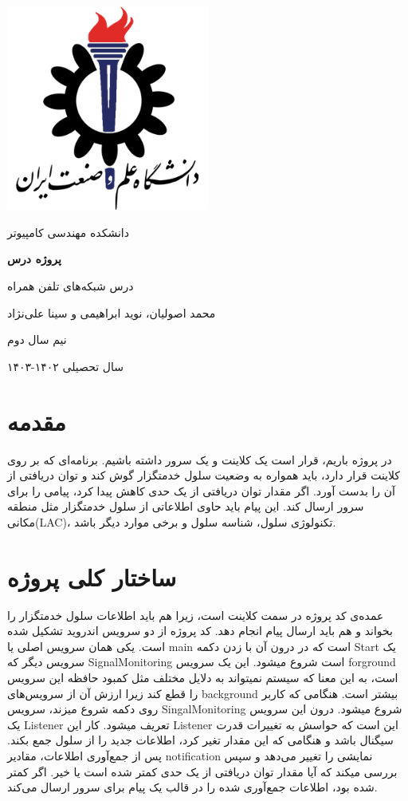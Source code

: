 \documentclass{article}
\begin{document}
\begin{titlepage}
  \centering
  \includegraphics[width=0.5\textwidth]{iust}\par\vspace{1cm}
  {\scshape\LARGE دانشکده مهندسی کامپیوتر \par}
  \vspace{1cm}
  {\huge\bfseries پروژه درس  \par}
  \vspace{1cm}
  {\Large درس شبکه‌های تلفن همراه \par}
  \vspace{1cm}
  {\large محمد اصولیان، نوید ابراهیمی و سینا علی‌نژاد \par}
  \vspace{5cm}
  {\large نیم سال دوم \par}
  {\large سال تحصیلی ۱۴۰۲-۱۴۰۳ \par}
\end{titlepage}
\newpage
\doublespacing
\section*{مقدمه}  
در پروژه باریم، قرار است یک کلاینت و یک سرور داشته باشیم. برنامه‌ای که بر روی کلاینت قرار دارد، باید همواره به وضعیت سلول خدمتگزار گوش کند و توان دریافتی از آن را بدست آورد. اگر مقدار توان دریافتی از یک حدی کاهش پیدا کرد، پیامی را برای سرور ارسال کند. این پیام باید حاوی اطلاعاتی از سلول خدمتگزار مثل منطقه مکانی(LAC)، تکنولوژی سلول، شناسه سلول و برخی موارد دیگر باشد. 

\section*{ساختار کلی پروژه}
عمده‌ی کد پروژه در سمت کلاینت است، زیرا هم باید اطلاعات سلول خدمتگزار را بخواند و هم باید ارسال پیام انجام دهد. کد پروژه از دو سرویس اندروید تشکیل شده است. یکی همان سرویس اصلی یا main است که در درون آن با زدن دکمه Start یک سرویس دیگر که SignalMonitoring است شروع میشود. این یک سرویس forground است، به این معنا که سیستم نمیتواند به دلایل مختلف مثل کمبود حافظه این سرویس را قطع کند زیرا ارزش آن از سرویس‌های background بیشتر است. هنگامی که کاربر روی دکمه شروع میزند، سرویس SingalMonitoring شروع میشود. درون این سرویس یک Listener تعریف میشود. کار این Listener این است که حواسش به تغییرات قدرت سیگنال باشد و هنگامی که این مقدار تغیر کرد، اطلاعات جدید را از سلول جمع بکند. پس از جمع‌آوری اطلاعات، مقادیر notification نمایشی را تغییر می‌دهد و سپس بررسی میکند که آیا مقدار توان دریافتی از یک حدی کمتر شده است یا خیر. اگر کمتر شده بود، اطلاعات جمع‌آوری شده را در قالب یک پیام برای سرور ارسال می‌کند.  
\singlespacing
\end{document}
